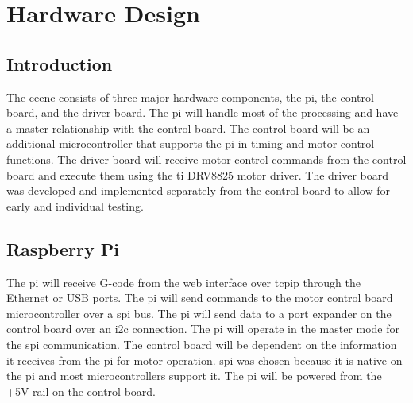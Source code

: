 \section{Hardware Design}

\subsection{Introduction}
The \gls{ceenc} consists of three major hardware components, the \gls{pi}, the control board, and the driver board.
The \gls{pi} will handle most of the processing and have a master relationship with the control board.
The control board will be an additional microcontroller that supports the \gls{pi} in timing and motor control functions.
The driver board will receive motor control commands from the control board and execute them using the \gls{ti} DRV8825 motor driver.
The driver board was developed and implemented separately from the control board to allow for early and individual testing.

\subsection{Raspberry Pi}
The \gls{pi} will receive G-code from the web interface over \gls{tcpip} through the Ethernet or USB ports.
The \gls{pi} will send commands to the motor control board microcontroller over a \gls{spi} bus.
The \gls{pi} will send data to a port expander on the control board over an \gls{i2c} connection.
The \gls{pi} will operate in the master mode for the \gls{spi} communication.
The control board will be dependent on the information it receives from the \gls{pi} for motor operation.
\gls{spi} was chosen because it is native on the \gls{pi} and most microcontrollers support it.
The \gls{pi} will be powered from the +5V rail on the control board.

